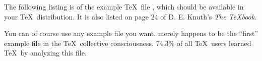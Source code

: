 

\nopagenumbers

The following listing is of the example \TeX\ file ,
which should be available in your \TeX\ distribution.  It is also
listed on page 24 of D. E. Knuth’s {\sl The \TeX book}.

You can of course use any example file you want.  
merely happens to be the “first” example file in the \TeX\
collective consciousness.  74.3\% of all \TeX\ users learned
\TeX\ by analyzing this file.

\bigskip



\bye
